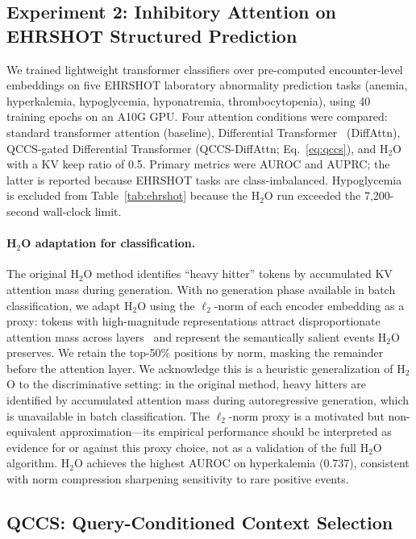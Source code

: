 \documentclass{article}
\begin{document}
\subsection{Experiment 2: Inhibitory Attention on EHRSHOT Structured Prediction}
\label{sec:exp2}

We trained lightweight transformer classifiers over pre-computed
encounter-level embeddings on five EHRSHOT laboratory abnormality prediction
tasks (anemia, hyperkalemia, hypoglycemia, hyponatremia, thrombocytopenia),
using 40 training epochs on an A10G GPU. Four attention conditions were
compared: standard transformer attention (baseline), Differential
Transformer~\cite{ye2025differential} (DiffAttn), QCCS-gated Differential
Transformer (QCCS-DiffAttn; Eq.~\ref{eq:qccs}), and H$_2$O~\cite{zhang2023h2o}
with a KV keep ratio of 0.5. Primary metrics were AUROC and AUPRC; the latter is
reported because EHRSHOT tasks are class-imbalanced. Hypoglycemia is excluded
from Table~\ref{tab:ehrshot} because the H$_2$O run exceeded the 7,200-second
wall-clock limit.

\paragraph{H$_2$O adaptation for classification.} The original H$_2$O method
identifies ``heavy hitter'' tokens by accumulated KV attention mass during generation.
With no generation phase available in batch classification, we adapt H$_2$O
using the $\ell_2$-norm of each encoder embedding as a proxy: tokens with
high-magnitude representations attract disproportionate attention mass across
layers~\cite{zhang2023h2o} and represent the semantically salient events H$_2$O
preserves. We retain the top-50\% positions by norm, masking the remainder before
the attention layer. We acknowledge this is a heuristic generalization of H$_2$O
to the discriminative setting: in the original method, heavy hitters are
identified by accumulated attention mass during autoregressive generation, which
is unavailable in batch classification. The $\ell_2$-norm proxy is a motivated
but non-equivalent approximation---its empirical performance should be
interpreted as evidence for or against this proxy choice, not as a validation
of the full H$_2$O algorithm. H$_2$O achieves the highest AUROC on hyperkalemia (0.737),
consistent with norm compression sharpening sensitivity to rare positive events.

\subsection{QCCS: Query-Conditioned Context Selection}
\label{sec:qccs}
\end{document}
